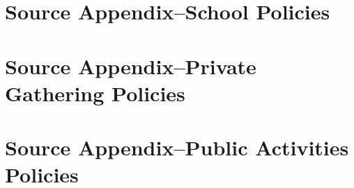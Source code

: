 \documentclass[11pt, a4paper, leqno]{article}
\begin{document}
\section*{Source Appendix--School Policies} %
\label{sec:source appendix school policies}




\clearpage

\section*{Source Appendix--Private Gathering Policies} %
\label{sec:source appendix private gathering policies}




\clearpage

\section*{Source Appendix--Public Activities Policies} %
\label{sec:source appendix public activities policies}




\clearpage

\printbibliography
{}



\end{document}
